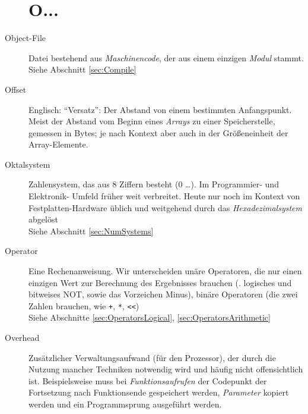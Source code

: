 \begin{appendices}
\begin{description}
\section*{O...}
\item[Object-File] Datei bestehend aus \emph{Maschinencode}, der aus einem einzigen \emph{Modul} 
	stammt.\\
	Siehe Abschnitt \ref{sec:Compile}
\item[Offset] Englisch: \enquote{Versatz}: Der Abstand von einem bestimmten Anfangspunkt. Meist der
	Abstand vom Beginn eines \emph{Arrays} zu einer Speicherstelle, gemessen in Bytes; je nach Kontext
	aber auch in der Größeneinheit der Array-Elemente.
\item[Oktalsystem] Zahlensystem, das aus 8 Ziffern besteht (0 \ldots). Im Programmier- und Elektronik-
	Umfeld früher weit verbreitet. Heute nur noch im Kontext von Festplatten-Hardware üblich und
	weitgehend durch das \emph{Hexadezimalsystem} abgelöst\\
	Siehe Abschnitt \ref{sec:NumSystems}
\item[Operator] Eine Rechenanweisung. Wir unterscheiden unäre Operatoren, die nur einen einzigen Wert
	zur Berechnung des Ergebnisses brauchen (\eg. logisches und bitweises NOT, sowie das Vorzeichen
	Minus), binäre Operatoren (die zwei Zahlen brauchen, wie \eg \texttt{+}, \texttt{*}, \texttt{<{}<})
	\\
	Siehe Abschnitte \ref{sec:OperatorsLogical}, \ref{sec:OperatorsArithmetic}
\item[Overhead] Zusätzlicher Verwaltungsaufwand (für den Prozessor), der durch die Nutzung mancher
	Techniken notwendig wird und häufig nicht offensichtlich ist. Beispielsweise muss bei
	\emph{Funktionsaufrufen} der Codepunkt der Fortsetzung nach Funktionsende gespeichert werden,
	\emph{Parameter} kopiert werden und ein Programmsprung ausgeführt werden.


\end{description}
\end{appendices}
